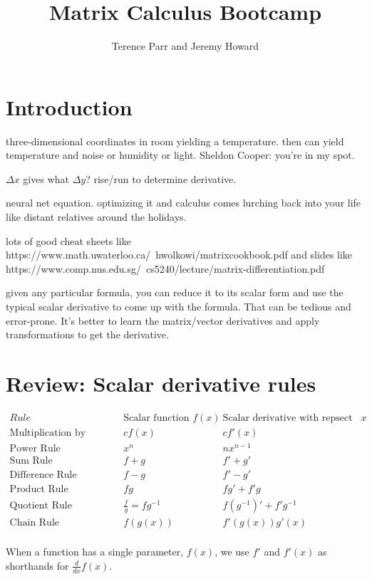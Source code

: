 \documentclass[11pt]{article}
\title{Matrix Calculus Bootcamp}
\author{Terence Parr and Jeremy Howard}
\begin{document}
\maketitle

\section{Introduction}

three-dimensional coordinates in room yielding a temperature. then can yield temperature and noise or humidity or light.  Sheldon Cooper: you're in my spot.

$\Delta x$ gives what $\Delta y$? rise/run to determine derivative.

neural net equation. optimizing it and calculus comes lurching back into your life like distant relatives around the holidays.

 lots of good cheat sheets like https://www.math.uwaterloo.ca/~hwolkowi/matrixcookbook.pdf and slides like https://www.comp.nus.edu.sg/~cs5240/lecture/matrix-differentiation.pdf
 
given any particular formula, you can reduce it to its scalar form and use the typical scalar derivative to come up with the formula. That can be tedious and error-prone. It's better to learn the matrix/vector derivatives and apply transformations to get the derivative.

\section{Review: Scalar derivative rules}

$
\begin{array}{lcc}
Rule & \text{Scalar function } f(x) & \text{Scalar derivative with repsect to } x\\
\hline
\text{Multiplication by constant} &	cf(x)	&cf'(x)\\
\text{Power Rule}	& x^n	& nx^{n-1}\\
\text{Sum Rule}	& f + g	& f' + g'\\
\text{Difference Rule}	& f - g	& f' - g'\\
\text{Product Rule}	& fg & f g' + f' g\\
\text{Quotient Rule}	& \frac{f}{g} = fg^{-1} & f (g^{-1})' + f' g^{-1}\\
\text{Chain Rule}	 & f(g(x)) &   f'(g(x))g'(x)\\
\end{array}
$

When a function has a single parameter, $f(x)$, we use $f'$ and $f'(x)$ as shorthands for $\frac{d}{dx} f(x)$.  
\end{document}
